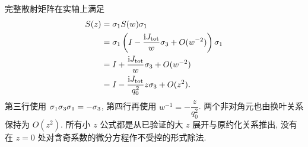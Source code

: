 完整散射矩阵在实轴上满足
\begin{align*}
S(z)
&=\sigma_1S(w)\sigma_1\\
&=\sigma_1\left(I-\dfrac{\mathrm{i} J_{\rm tot}}{w}\sigma_3
+O(w^{-2})\right)\sigma_1\\
&=I+\dfrac{\mathrm{i} J_{\rm tot}}{w}\sigma_3+O(w^{-2})\\
&=I-\dfrac{\mathrm{i} J_{\rm tot}}{q_0^2}z\sigma_3+O(z^2).
\end{align*}
第三行使用 $\sigma_1\sigma_3\sigma_1=-\sigma_3$,
第四行再使用 $w^{-1}=-\dfrac{z}{q_0^2}$.
两个非对角元也由换叶关系保持为 $O(z^2)$.
所有小 $z$ 公式都是从已验证的大 $z$ 展开与原约化关系推出,
没有在 $z=0$ 处对含奇系数的微分方程作不受控的形式除法.
